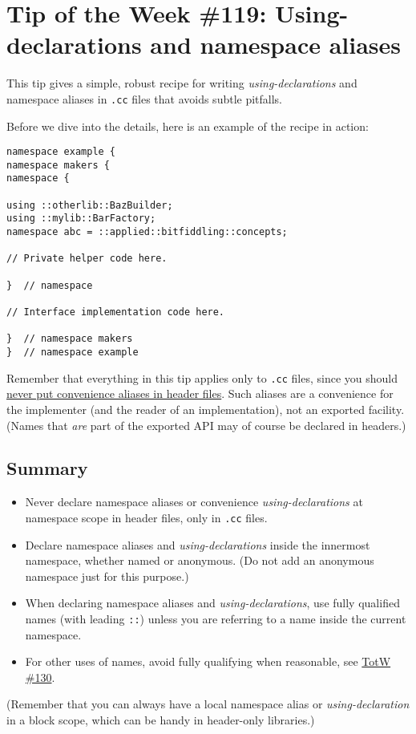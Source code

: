 
\chapter{Tip of the Week \#119: Using-declarations and namespace aliases}\label{ch:tip-of-the-week-119}

This tip gives a simple, robust recipe for writing \emph{using-declarations} and namespace aliases in \texttt{.cc} files that avoids subtle pitfalls.

Before we dive into the details, here is an example of the recipe in action:

\begin{verbatim}
namespace example {
namespace makers {
namespace {

using ::otherlib::BazBuilder;
using ::mylib::BarFactory;
namespace abc = ::applied::bitfiddling::concepts;

// Private helper code here.

}  // namespace

// Interface implementation code here.

}  // namespace makers
}  // namespace example
\end{verbatim}

Remember that everything in this tip applies only to \texttt{.cc} files, since you should \hyperref[sec:aliases]{never put convenience aliases in header files}. Such aliases are a convenience for the implementer (and the reader of an implementation), not an exported facility. (Names that \emph{are} part of the exported API may of course be declared in headers.)

\section{Summary}
\begin{itemize}
    \item Never declare namespace aliases or convenience \emph{using-declarations} at namespace scope in header files, only in \texttt{.cc} files.
    \item Declare namespace aliases and \emph{using-declarations} inside the innermost namespace, whether named or anonymous. (Do not add an anonymous namespace just for this purpose.)
    \item When declaring namespace aliases and \emph{using-declarations}, use fully qualified names (with leading \texttt{::}) unless you are referring to a name inside the current namespace.
    \item For other uses of names, avoid fully qualifying when reasonable, see \hyperref[ch:tip-of-the-week-130]{TotW \#130}.
\end{itemize}
(Remember that you can always have a local namespace alias or \emph{using-declaration} in a block scope, which can be handy in header-only libraries.)

